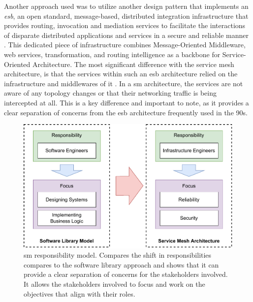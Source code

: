 Another approach used was to utilize another design pattern that implements an \textit{\gls{esb}}, an open standard, message-based, distributed integration infrastructure that provides routing, invocation and mediation services to facilitate the interactions of disparate distributed applications and services in a secure and reliable manner \cite{menge2007enterprise}. This dedicated piece of infrastructure combines  Message-Oriented Middleware, web services, transformation, and routing intelligence as a backbone for Service-Oriented Architecture. The most significant difference with the service mesh architecture, is that the services within such an \gls{esb} architecture relied on the infrastructure and middlewares of it \cite{samnewman2022}. In a \gls{sm} architecture, the services are not aware of any topology changes or that their networking traffic is being intercepted at all. This is a key difference and important to note, as it provides a clear separation of concerns from the \gls{esb} architecture frequently used in the 90s.

\begin{figure}[!t]
    \centering
    
    \includegraphics[width=0.8\linewidth]{2_background/figures/responsibility-model.pdf}

    \caption[\Gls{sm}responsibility model.]{\Gls{sm} responsibility model. Compares the shift in responsibilities compares to the software library approach and shows that it can provide a clear separation of concerns for the stakeholders involved. It allows the stakeholders involved to focus and work on the objectives that align with their roles.}
    \label{fig:service-mesh-responsibility-model}
\end{figure}


